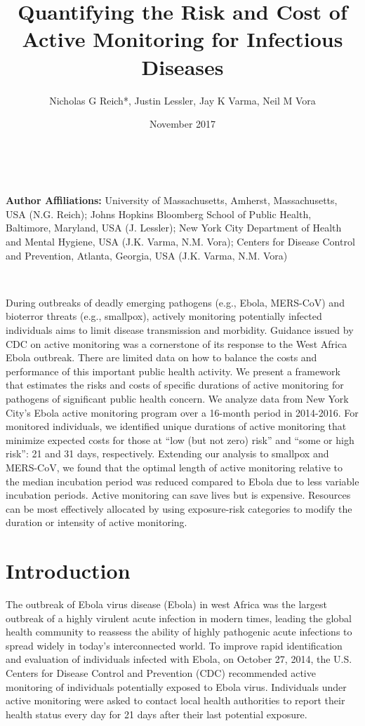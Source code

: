 \documentclass[]{article}
\title{Quantifying the Risk and Cost of Active Monitoring for Infectious
Diseases}
\author{Nicholas G Reich*, Justin Lessler, Jay K Varma, Neil M Vora}
\date{November 2017}
\begin{document}
\maketitle

~

\textbf{Author Affiliations:} University of Massachusetts, Amherst,
Massachusetts, USA (N.G. Reich); Johns Hopkins Bloomberg School of
Public Health, Baltimore, Maryland, USA (J. Lessler); New York City
Department of Health and Mental Hygiene, USA (J.K. Varma, N.M. Vora);
Centers for Disease Control and Prevention, Atlanta, Georgia, USA (J.K.
Varma, N.M. Vora)

~

During outbreaks of deadly emerging pathogens (e.g., Ebola, MERS-CoV)
and bioterror threats (e.g., smallpox), actively monitoring potentially
infected individuals aims to limit disease transmission and morbidity.
Guidance issued by CDC on active monitoring was a cornerstone of its
response to the West Africa Ebola outbreak. There are limited data on
how to balance the costs and performance of this important public health
activity. We present a framework that estimates the risks and costs of
specific durations of active monitoring for pathogens of significant
public health concern. We analyze data from New York City's Ebola active
monitoring program over a 16-month period in 2014-2016. For monitored
individuals, we identified unique durations of active monitoring that
minimize expected costs for those at ``low (but not zero) risk'' and
``some or high risk'': 21 and 31 days, respectively. Extending our
analysis to smallpox and MERS-CoV, we found that the optimal length of
active monitoring relative to the median incubation period was reduced
compared to Ebola due to less variable incubation periods. Active
monitoring can save lives but is expensive. Resources can be most
effectively allocated by using exposure-risk categories to modify the
duration or intensity of active monitoring.

\section{Introduction}\label{introduction}

The outbreak of Ebola virus disease (Ebola) in west Africa was the
largest outbreak of a highly virulent acute infection in modern times,
leading the global health community to reassess the ability of highly
pathogenic acute infections to spread widely in today's interconnected
world. To improve rapid identification and evaluation of individuals
infected with Ebola, on October 27, 2014, the U.S. Centers for Disease
Control and Prevention (CDC) recommended active monitoring of
individuals potentially exposed to Ebola virus. Individuals under active
monitoring were asked to contact local health authorities to report
their health status every day for 21 days after their last potential
exposure.
\end{document}

